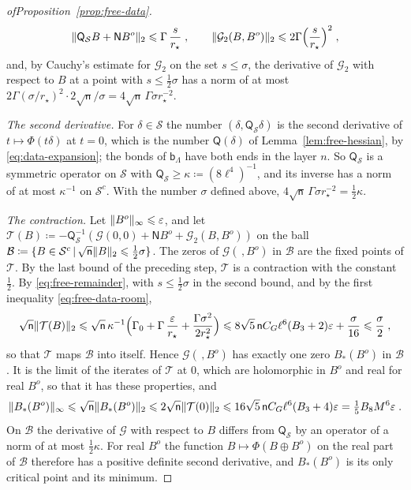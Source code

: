 \documentclass[11pt]{preprint}
\makeatletter
\DeclarePairedDelimiter{\norm}{\lVert}{\rVert}
\newcommand*{\bigcdot}{}%
\DeclareRobustCommand*{\bigcdot}{%
	\mathbin{\mathpalette\bigcdot@{}}%
}
\newcommand*{\bigcdot@scalefactor}{.7}
\newcommand*{\bigcdot@widthfactor}{1.15}
\newcommand*{\bigcdot@}[2]{%
	\sbox0{$#1\vcenter{}$}%
	\sbox2{$#1\cdot\m@th$}%
	\hbox to \bigcdot@widthfactor\wd2{%
		\hss
		\raise\ht0\hbox{%
			\scalebox{\bigcdot@scalefactor}{%
				\lower\ht0\hbox{$#1\bullet\m@th$}%
			}%
		}%
		\hss
	}%
}
\numberwithin{equation}{section}
\makeatother
\begin{document}
\begin{proof}[ofProposition~\ref{prop:free-data}]
\begin{equation}\label{eq:free-remainder}
    \norm{\mathsf Q_{\mathcal S}B + \mathsf NB^o}_2 \leqslant \Gamma\,\frac{s}{r_\star}\;,
    \qquad
    \norm{\mathcal G_2(B, B^o)}_2 \leqslant 2\Gamma\Bigl(\frac{s}{r_\star}\Bigr)^2\;,
\end{equation}
and, by Cauchy's estimate for $\mathcal G_2$ on the set $s \leqslant \sigma$, the derivative of $\mathcal G_2$ with respect to $B$ at a point with $s \leqslant \frac{1}{2}\sigma$ has a norm of at most $2\Gamma(\sigma/r_\star)^2 \cdot 2\sqrt{\mathsf n}/\sigma = 4\sqrt{\mathsf n}\,\Gamma\sigma r_\star^{-2}$.

\emph{The second derivative.} For $\delta \in \mathcal S$ the number $(\delta, \mathsf Q_{\mathcal S}\delta)$ is the second derivative of $t \mapsto \Phi(t\delta)$ at $t = 0$, which is the number $\mathsf Q(\delta)$ of Lemma~\ref{lem:free-hessian}, by \eqref{eq:data-expansion}; the bonds of $\mathsf b_\Lambda$ have both ends in the layer $n$. So $\mathsf Q_{\mathcal S}$ is a symmetric operator on $\mathcal S$ with $\mathsf Q_{\mathcal S} \geqslant \kappa \coloneqq (8\ell^4)^{-1}$, and its inverse has a norm of at most $\kappa^{-1}$ on $\mathcal S^c$. With the number $\sigma$ defined above, $4\sqrt{\mathsf n}\,\Gamma\sigma r_\star^{-2} = \frac{1}{2}\kappa$.

\emph{The contraction.} Let $\norm{B^o}_\infty \leqslant \varepsilon$, and let $\mathcal T(B) \coloneqq -\mathsf Q_{\mathcal S}^{-1}(\mathcal G(0, 0) + \mathsf NB^o + \mathcal G_2(B, B^o))$ on the ball $\mathcal B \coloneqq \{ B \in \mathcal S^c \,|\, \sqrt{\mathsf n}\norm B_2 \leqslant \frac{1}{2}\sigma \}$. The zeros of $\mathcal G(\bigcdot\,, B^o)$ in $\mathcal B$ are the fixed points of $\mathcal T$. By the last bound of the preceding step, $\mathcal T$ is a contraction with the constant $\frac{1}{2}$. By \eqref{eq:free-remainder}, with $s \leqslant \frac{1}{2}\sigma$ in the second bound, and by the first inequality \eqref{eq:free-data-room},
\[
    \sqrt{\mathsf n}\norm{\mathcal T(B)}_2 \leqslant \sqrt{\mathsf n}\,\kappa^{-1}\Bigl(\Gamma_0 + \Gamma\,\frac{\varepsilon}{r_\star} + \frac{\Gamma\sigma^2}{2r_\star^2}\Bigr) \leqslant 8\sqrt 5\,\mathsf nC_G\ell^6(B_3 + 2)\varepsilon + \frac{\sigma}{16} \leqslant \frac{\sigma}{2}\;,
\]
so that $\mathcal T$ maps $\mathcal B$ into itself. Hence $\mathcal G(\bigcdot\,, B^o)$ has exactly one zero $B_*(B^o)$ in $\mathcal B$. It is the limit of the iterates of $\mathcal T$ at $0$, which are holomorphic in $B^o$ and real for real $B^o$, so that it has these properties, and
\[
    \norm{B_*(B^o)}_\infty \leqslant \sqrt{\mathsf n}\norm{B_*(B^o)}_2 \leqslant 2\sqrt{\mathsf n}\norm{\mathcal T(0)}_2 \leqslant 16\sqrt 5\,\mathsf nC_G\ell^6(B_3 + 4)\varepsilon = \tfrac{1}{5}B_8M^6\varepsilon\;.
\]
On $\mathcal B$ the derivative of $\mathcal G$ with respect to $B$ differs from $\mathsf Q_{\mathcal S}$ by an operator of a norm of at most $\frac{1}{2}\kappa$. For real $B^o$ the function $B \mapsto \Phi(B \oplus B^o)$ on the real part of $\mathcal B$ therefore has a positive definite second derivative, and $B_*(B^o)$ is its only critical point and its minimum.


\end{proof}
\end{document}
